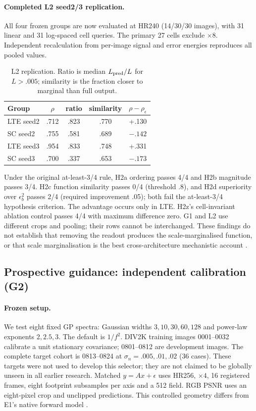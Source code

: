 \paragraph{Completed L2 seed2/3 replication.}
All four frozen groups are now evaluated at HR240 (14/30/30 images), with
31 linear and 31 log-spaced cell queries. The primary 27 cells exclude
$\times8$. Independent recalculation from per-image signal and error
energies reproduces all pooled values.
\begin{table}[t]\centering\small
\caption{L2 replication. Ratio is median $L_{\rm pred}/L$ for $L>.005$;
similarity is the fraction closer to marginal than full output.}
\label{tab:l2multi}
\begin{tabular}{lcccc}\toprule
Group & $\rho$ & ratio & similarity & $\rho-\rho_\epsilon$\\\midrule
LTE seed2 & .712 & .823 & .770 & +.130\\
SC seed2 & .755 & .581 & .689 & $-.142$\\
LTE seed3 & .954 & .833 & .748 & +.331\\
SC seed3 & .700 & .337 & .653 & $-.173$\\\bottomrule
\end{tabular}
\end{table}
Under the original at-least-3/4 rule, H2a ordering passes 4/4 and H2b
magnitude passes 3/4. H2c function similarity passes 0/4 (threshold .8),
and H2d superiority over $\epsilon_b^2$ passes 2/4 (required improvement
.05); both fail the at-least-3/4 hypothesis criterion. The advantage occurs
only in LTE. H2z's cell-invariant ablation
control passes 4/4 with maximum difference zero. G1 and L2 use different
crops and pooling; their rows cannot be interchanged. These findings do
not establish that removing the readout produces the scale-marginalised
function, or that scale marginalisation is the best cross-architecture
mechanistic account .

\subsection{Prospective guidance: independent calibration (G2)}\label{sec:g2}
\paragraph{Frozen setup.} We test eight fixed GP spectra: Gaussian widths
$3,10,30,60,128$ and power-law exponents $2,2.5,3$. The default is
$1/f^2$. DIV2K training images 0001--0032 calibrate a unit stationary
covariance; 0801--0812 are development images. The complete target cohort
is 0813--0824 at $\sigma_n=.005,.01,.02$ (36 cases). These targets were not
used to develop this selector; they are not claimed to be globally unseen
in all earlier research. Matched $y=Ax+\epsilon$ uses HR256, $\times4$,
16 registered frames, eight footprint subsamples per axis and a 512 field.
RGB PSNR uses an eight-pixel crop and unclipped predictions. This controlled
geometry differs from E1's native forward model .

